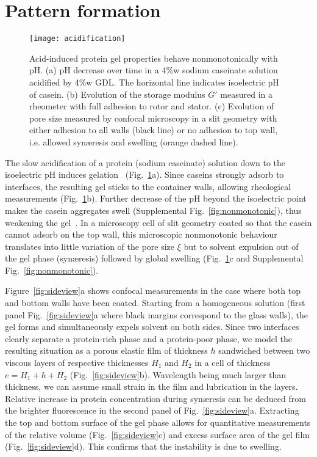 \documentclass[twocolumn,superscriptaddress,showpacs,preprintnumbers,
amsmath,amssymb,prl]{revtex4-1}
\begin{document}
\section*{Pattern formation}

\begin{figure}[b]
	\texttt{[image: acidification]}%
	\caption{Acid-induced protein gel properties behave nonmonotonically with pH. (a) pH decrease over time in a 4\%w sodium caseinate solution acidified by 4\%w GDL. The horizontal line indicates isoelectric pH of casein. (b) Evolution of the storage modulus $G'$ measured in a rheometer with full adhesion to rotor and stator. (c) Evolution of pore size measured by confocal microscopy in a slit geometry with either adhesion to all walls (black line) or no adhesion to top wall, i.e. allowed syn\ae{}resis and swelling (orange dashed line).}%
	\label{fig:acidification}%
\end{figure}


The slow acidification of a protein (sodium caseinate) solution down to the isoelectric pH induces gelation~\cite{Bremer1989} (Fig.~\ref{fig:acidification}a). Since caseins strongly adsorb to interfaces, the resulting gel sticks to the container walls, allowing rheological measurements (Fig.~\ref{fig:acidification}b). Further decrease of the pH beyond the isoelectric point makes the casein aggregates swell (Supplemental Fig.~\ref{fig:nonmonotonic}), thus weakening the gel~\cite{Braga2006}. In a microscopy cell of slit geometry coated so that the casein cannot adsorb on the top wall, this microscopic nonmonotonic behaviour translates into little variation of the pore size $\xi$ but to solvent expulsion out of the gel phase (syn\ae{}resis) followed by global swelling (Fig.~\ref{fig:acidification}c and Supplemental Fig.~\ref{fig:nonmonotonic}).



Figure~\ref{fig:sideview}a shows confocal measurements in the case where both top and bottom walls have been coated. Starting from a homogeneous solution (first panel Fig.~\ref{fig:sideview}a where black margins correspond to the glass walls), the gel forms and simultaneously expels solvent on both sides. Since two interfaces clearly separate a protein-rich phase and a protein-poor phase, we model the resulting situation as a porous elastic film of thickness $h$ sandwiched between two viscous layers of respective thicknesses $H_1$ and $H_2$ in a cell of thickness $e=H_1+h+H_2$ (Fig.~\ref{fig:sideview}b). Wavelength being much larger than thickness, we can assume small strain in the film and lubrication in the layers. Relative increase in protein concentration during syn\ae{}resis can be deduced from the brighter fluorescence in the second panel of Fig.~\ref{fig:sideview}a. Extracting the top and bottom surface of the gel phase allows for quantitative measurements of the relative volume (Fig.~\ref{fig:sideview}c) and excess surface area of the gel film (Fig.~\ref{fig:sideview}d). This confirms that the instability is due to swelling.
\end{document}
